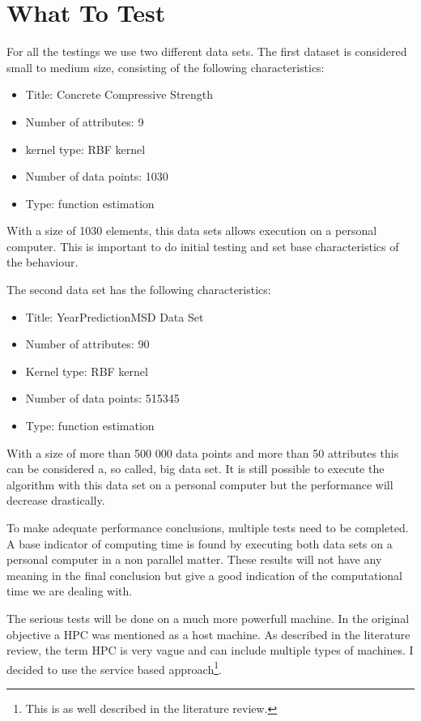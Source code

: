 \section{What To Test}
For all the testings we use two different data sets.
The first dataset is considered small to medium size, consisting of the following characteristics:
\begin{itemize}
	\item Title: Concrete Compressive Strength\cite{UCIMachi66:online}
	\item Number of attributes: 9
	\item kernel type: RBF kernel
	\item Number of data points: 1030
	\item Type: function estimation
\end{itemize}
With a size of 1030 elements, this data sets allows execution on a personal computer.
This is important to do initial testing and set base characteristics of the behaviour.
\par 
The second data set has the following characteristics:
\begin{itemize}
	\item Title: YearPredictionMSD Data Set\cite{UCIMachi93:online}
	\item Number of attributes: 90
	\item Kernel type: RBF kernel
	\item Number of data points: 515345
	\item Type: function estimation
\end{itemize}
With a size of more than 500 000 data points and more than 50 attributes this can be considered a, so called, big data set.
It is still possible to execute the algorithm with this data set on a personal computer but the performance will decrease drastically.
\par 
To make adequate performance conclusions, multiple tests need to be completed.
A base indicator of computing time is found by executing both data sets on a personal computer in a non parallel matter.
These results will not have any meaning in the final conclusion but give a good indication of the computational time we are dealing with.
\par 
The serious tests will be done on a much more powerfull machine. 
In the original objective a HPC was mentioned as a host machine.
As described in the literature review, the term HPC is very vague and can include multiple types of machines.
I decided to use the service based approach\footnote{This is as well described in the literature review.}.
